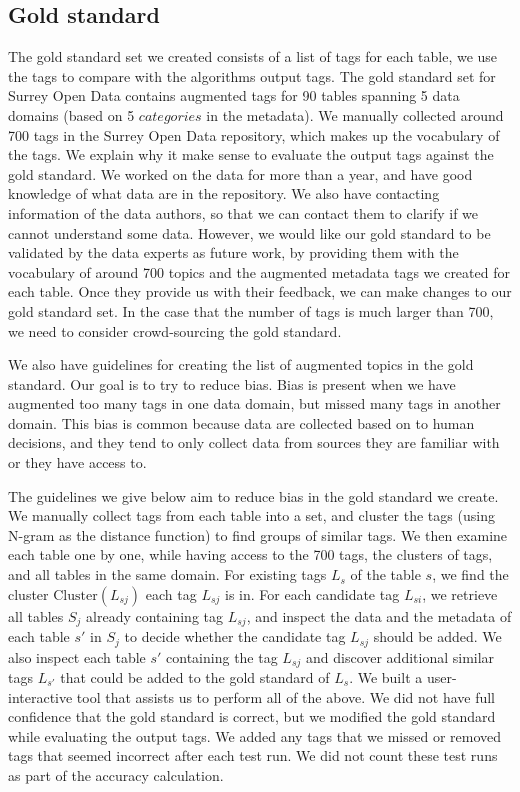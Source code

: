 \subsection{Gold standard}
\label{ssec:GoldStandard}

The gold standard set we created consists of a list of tags for each table, we use the tags to compare with the algorithms output tags. The gold standard set for Surrey Open Data contains augmented tags for 90 tables spanning 5 data domains (based on 5 $categories$ in the metadata). We manually collected around 700 tags in the Surrey Open Data repository, which makes up the vocabulary of the tags. We explain why it make sense to evaluate the output tags against the gold standard. We worked on the data for more than a year, and have good knowledge of what data are in the repository. We also have contacting information of the data authors, so that we can contact them to clarify if we cannot understand some data. However, we would like our gold standard to be validated by the data experts as future work, by providing them with the vocabulary of around 700 topics and the augmented metadata tags we created for each table. Once they provide us with their feedback, we can make changes to our gold standard set. In the case that the number of tags is much larger than 700, we need to consider crowd-sourcing the gold standard.

We also have guidelines for creating the list of augmented topics in the gold standard. Our goal is to try to reduce bias. Bias is present when we have augmented too many tags in one data domain, but missed many tags in another domain. This bias is common because data are collected based on to human decisions, and they tend to only collect data from sources they are familiar with or they have access to.

The guidelines we give below aim to reduce bias in the gold standard we create. We manually collect tags from each table into a set, and cluster the tags (using N-gram as the distance function) to find groups of similar tags. We then examine each table one by one, while having access to the 700 tags, the clusters of tags, and all tables in the same domain. For existing tags $L_{s}$ of the table $s$, we find the cluster $\text{Cluster}(L_{sj})$ each tag $L_{sj}$ is in. For each candidate tag $L_{si}$, we retrieve all tables $S_{j}$ already containing tag $L_{sj}$, and inspect the data and the metadata of each table $s'$ in $S_{j}$ to decide whether the candidate tag $L_{sj}$ should be added. We also inspect each table $s'$ containing the tag $L_{sj}$ and discover additional similar tags $L_{s'}$ that could be added to the gold standard of $L_{s}$. We built a user-interactive tool that assists us to perform all of the above. We did not have full confidence that the gold standard is correct, but we modified the gold standard while evaluating the output tags. We added any tags that we missed or removed tags that seemed incorrect after each test run. We did not count these test runs as part of the accuracy calculation.

